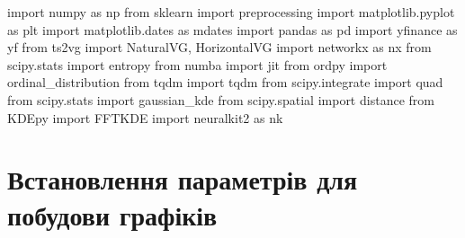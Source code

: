 \documentclass[
  letterpaper,
]{report}
\newenvironment{Shaded}{\begin{snugshade}}{\end{snugshade}}
\newcommand{\ImportTok}[1]{\textcolor[rgb]{0.00,0.46,0.62}{#1}}
\newcommand{\NormalTok}[1]{\textcolor[rgb]{0.00,0.23,0.31}{#1}}
\begin{document}
\begin{Shaded}
\begin{Highlighting}[]
\ImportTok{import}\NormalTok{ numpy }\ImportTok{as}\NormalTok{ np}
\ImportTok{from}\NormalTok{ sklearn }\ImportTok{import}\NormalTok{ preprocessing}
\ImportTok{import}\NormalTok{ matplotlib.pyplot }\ImportTok{as}\NormalTok{ plt}
\ImportTok{import}\NormalTok{ matplotlib.dates }\ImportTok{as}\NormalTok{ mdates}
\ImportTok{import}\NormalTok{ pandas }\ImportTok{as}\NormalTok{ pd}
\ImportTok{import}\NormalTok{ yfinance }\ImportTok{as}\NormalTok{ yf}
\ImportTok{from}\NormalTok{ ts2vg }\ImportTok{import}\NormalTok{ NaturalVG, HorizontalVG}
\ImportTok{import}\NormalTok{ networkx }\ImportTok{as}\NormalTok{ nx}
\ImportTok{from}\NormalTok{ scipy.stats }\ImportTok{import}\NormalTok{ entropy}
\ImportTok{from}\NormalTok{ numba }\ImportTok{import}\NormalTok{ jit}
\ImportTok{from}\NormalTok{ ordpy }\ImportTok{import}\NormalTok{ ordinal\_distribution}
\ImportTok{from}\NormalTok{ tqdm }\ImportTok{import}\NormalTok{ tqdm}
\ImportTok{from}\NormalTok{ scipy.integrate }\ImportTok{import}\NormalTok{ quad}
\ImportTok{from}\NormalTok{ scipy.stats }\ImportTok{import}\NormalTok{ gaussian\_kde}
\ImportTok{from}\NormalTok{ scipy.spatial }\ImportTok{import}\NormalTok{ distance}
\ImportTok{from}\NormalTok{ KDEpy }\ImportTok{import}\NormalTok{ FFTKDE}
\ImportTok{import}\NormalTok{ neuralkit2 }\ImportTok{as}\NormalTok{ nk}
\end{Highlighting}
\end{Shaded}

\hypertarget{ux432ux441ux442ux430ux43dux43eux432ux43bux435ux43dux43dux44f-ux43fux430ux440ux430ux43cux435ux442ux440ux456ux432-ux434ux43bux44f-ux43fux43eux431ux443ux434ux43eux432ux438-ux433ux440ux430ux444ux456ux43aux456ux432}{%
\section{Встановлення параметрів для побудови
графіків}\label{ux432ux441ux442ux430ux43dux43eux432ux43bux435ux43dux43dux44f-ux43fux430ux440ux430ux43cux435ux442ux440ux456ux432-ux434ux43bux44f-ux43fux43eux431ux443ux434ux43eux432ux438-ux433ux440ux430ux444ux456ux43aux456ux432}}
\end{document}
